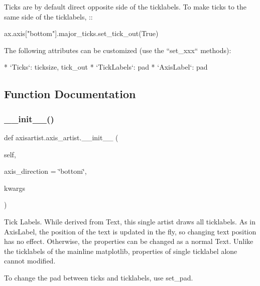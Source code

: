 \begin{DoxyVerb}
Ticks are by default direct opposite side of the ticklabels. To make ticks to
the same side of the ticklabels, ::

  ax.axis["bottom"].major_ticks.set_tick_out(True)

The following attributes can be customized (use the ``set_xxx`` methods):

* `Ticks`: ticksize, tick_out
* `TickLabels`: pad
* `AxisLabel`: pad
\end{DoxyVerb}
 

\subsection{Function Documentation}
\mbox{\label{namespaceaxisartist_1_1axis__artist_a1e2971fc727b631279986c595e3bc496}} 
\subsubsection{\texorpdfstring{\+\_\+\+\_\+init\+\_\+\+\_\+()}{\_\_init\_\_()}}
{\footnotesize\ttfamily def axisartist.\+axis\+\_\+artist.\+\_\+\+\_\+init\+\_\+\+\_\+ (\begin{DoxyParamCaption}\item[{}]{self,  }\item[{}]{axis\+\_\+direction = {\ttfamily \char`\"{}bottom\char`\"{}},  }\item[{}]{kwargs }\end{DoxyParamCaption})}

\begin{DoxyVerb}Tick Labels. While derived from Text, this single artist draws all
ticklabels. As in AxisLabel, the position of the text is updated
in the fly, so changing text position has no effect. Otherwise,
the properties can be changed as a normal Text. Unlike the
ticklabels of the mainline matplotlib, properties of single
ticklabel alone cannot modified.

To change the pad between ticks and ticklabels, use set_pad.
\end{DoxyVerb}
 \mbox{\label{namespaceaxisartist_1_1axis__artist_ab4988671b9cff3610746758c6d74ffb0}} 
